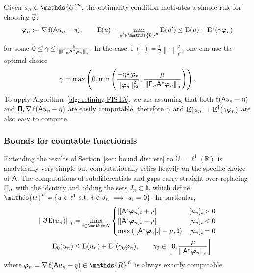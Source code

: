 \documentclass[smallextended]{svjour3}
\let\F\mathds\let\C\mathcal\newcommand{\R}{\F{R}}\newcommand{\A}{\tens{A}}
\newcommand{\norm}[1]{{\left\lVert #1 \right\rVert}}
\newcommand{\Norm}[1]{{\left\vert\kern-0.25ex\left\vert\kern-0.25ex\left\vert #1 \right\vert\kern-0.25ex\right\vert\kern-0.25ex\right\vert}}
\newcommand{\ip}[2]{#1 \vcenter{\hbox{\resizebox{6pt}{!}{\ensuremath\cdot}}} #2}
\newcommand{\op}[1]{\operatorname{#1}}
\newcommand{\1}{\F{1}}
\DeclareMathOperator{\st}{\;s.t.\;}
\newcommand{\data}{\eta}
\newcommand*{\var}[1]{%
	\IfEqCase{#1}{%
		{0}{u}%
		{1}{v}%
		{2}{w}%
	}[u#1]%
}
\newcommand*{\vars}[1]{%
	\IfEqCase{#1}{%
		{0}{\alpha}%
		{1}{\beta}%
		{2}{\gamma}%
		{3}{a}%
		{4}{b}%
		{5}{c}%
	}[k#1]%
}
\begin{document}
	Given $\var0_n\in \F{U}^n$, the optimality condition motivates a simple rule for choosing $\vec{\varphi}$:
	\begin{equation}
		\vec{\varphi}_n\coloneqq \nabla\op{f}(\A\var0_n - \data), \qquad \op{E}(\var0)-\min_{\var0'\in\F{U}^n}\op{E}(\var0') \leq \op{E}(\var0) +\op{E}^\dag(\vars2\vec{\varphi}_n)
	\end{equation}
	for some $0\leq \vars2\leq\frac{\mu}{\Norm{\tens{\Pi}_n\A^*\vec{\varphi}_n}_*}$. In the case $\op{f}(\cdot)=\frac12\norm{\cdot}_{\ell^2}^2$, one can use the optimal choice
	\begin{equation}
		\vars2 =\max\left(0, \min\left(\frac{-\ip{\data}{\vec{\varphi}_n}}{\norm{\vec{\varphi}_n}_{\ell^2}^2}, \frac{\mu}{\Norm{\tens{\Pi}_n\A^*\vec{\varphi}_n}_*}\right)\right).
	\end{equation}
	To apply Algorithm~\ref{alg: refining FISTA}, we are assuming that both $\op{f}(\A\var0_n-\data)$ and $\tens{\Pi}_n\nabla\op{f}(\A\var0_n-\data)$ are easily computable, therefore $\vars2$ and $\op{E}(\var0_n) +\op{E}^\dag(\vars2\vec{\varphi}_n)$ are also easy to compute.
	
	\subsubsection{Bounds for countable functionals}
	Extending the results of Section~\ref{sec: bound discrete} to $\F{U}=\ell^1(\R)$ is analytically very simple but computationally relies heavily on the specific choice of $\A$. The computations of subdifferentials and gaps carry straight over replacing $\mathsf{\Pi}_n$ with the identity and adding the sets $J_n\subset\F N$ which define $\F{U}^n = \{\var0\in\ell^1\st i\notin J_n\implies \var0_i=0\}$. In particular,
	\begin{align}
		\Norm{\partial\op{E}(\var0_n)}_* &= \max_{i\in\F N}\begin{cases}
			|[\A^*\vec{\varphi}_n]_i + \mu| & [\var0_n]_i>0
			\\|[\A^*\vec{\varphi}_n]_i - \mu| & [\var0_n]_i<0
			\\\max\left(|[\A^*\vec{\varphi}_n]_i| - \mu, 0\right) & [\var0_n]_i = 0
		\end{cases}
		\\ \op{E}_0(\var0_n) &\leq \op{E}(\var0_n) + \op{E}^\dag(\vars2_0\vec{\varphi}_n), \qquad \vars2_0\in\left[0,\frac{\mu}{\Norm{\A^*\vec{\varphi}_n}_*}\right]
	\end{align}
	where $\vec{\varphi}_n = \nabla\op{f}(\A\var0_n-\data)\in\R^m$ is always exactly computable.
	
\end{document}
